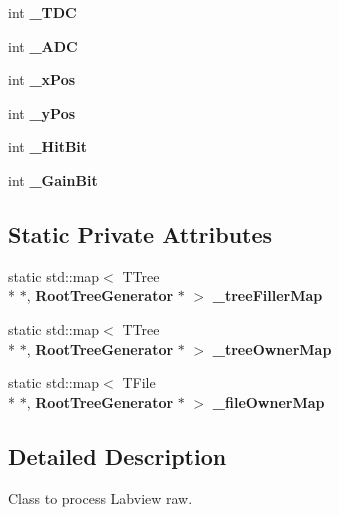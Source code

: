 \begin{DoxyCompactItemize}
\item 
int {\bfseries \-\_\-\-T\-D\-C}\label{classCALICE_1_1RootTreeGenerator_afe617610463d32361b66694ee8b0eb81}

\item 
int {\bfseries \-\_\-\-A\-D\-C}\label{classCALICE_1_1RootTreeGenerator_a17be8de3b6d4141fc160b9786d8a490a}

\item 
int {\bfseries \-\_\-x\-Pos}\label{classCALICE_1_1RootTreeGenerator_a5cb40db584a71f4fee52632af926d557}

\item 
int {\bfseries \-\_\-y\-Pos}\label{classCALICE_1_1RootTreeGenerator_a3b7c14462377dbf7f2aa7b567df36f07}

\item 
int {\bfseries \-\_\-\-Hit\-Bit}\label{classCALICE_1_1RootTreeGenerator_afb3bc01afed020817d8a85d4f44cdb9a}

\item 
int {\bfseries \-\_\-\-Gain\-Bit}\label{classCALICE_1_1RootTreeGenerator_ae14d571f1c455371bc5bc3ae391b9f22}

\end{DoxyCompactItemize}
\subsection*{Static Private Attributes}
\begin{DoxyCompactItemize}
\item 
static std\-::map$<$ T\-Tree \\*
$\ast$, {\bf Root\-Tree\-Generator} $\ast$ $>$ {\bfseries \-\_\-tree\-Filler\-Map}\label{classCALICE_1_1RootTreeGenerator_a1edff2386c6a6051202d21be447fea69}

\item 
static std\-::map$<$ T\-Tree \\*
$\ast$, {\bf Root\-Tree\-Generator} $\ast$ $>$ {\bfseries \-\_\-tree\-Owner\-Map}\label{classCALICE_1_1RootTreeGenerator_a331544fd3dfee404ad0d1c5492741ad4}

\item 
static std\-::map$<$ T\-File \\*
$\ast$, {\bf Root\-Tree\-Generator} $\ast$ $>$ {\bfseries \-\_\-file\-Owner\-Map}\label{classCALICE_1_1RootTreeGenerator_aaabe9bfde58f05c43dfa886545fa68ee}

\end{DoxyCompactItemize}


\subsection{Detailed Description}
Class to process Labview raw. 

